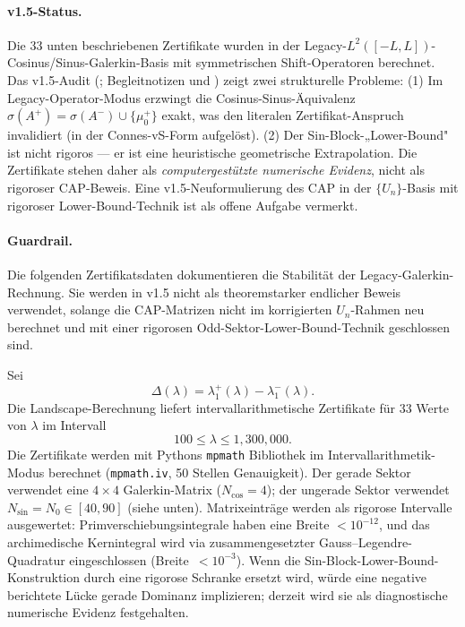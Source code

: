 \documentclass[11pt,a4paper]{article}
\theoremstyle{remark}
\theoremstyle{plain}
\begin{document}
\paragraph{v1.5-Status.} Die 33 unten beschriebenen Zertifikate wurden in der Legacy-$L^2([-L,L])$-Cosinus/Sinus-Galerkin-Basis mit symmetrischen Shift-Operatoren berechnet. Das v1.5-Audit (; Begleitnotizen  und ) zeigt zwei strukturelle Probleme: (1) Im Legacy-Operator-Modus erzwingt die Cosinus-Sinus-Äquivalenz $\sigma(A^+) = \sigma(A^-) \cup \{\mu^+_0\}$ exakt, was den literalen Zertifikat-Anspruch invalidiert (in der Connes-vS-Form aufgelöst). (2) Der Sin-Block-„Lower-Bound" ist nicht rigoros — er ist eine heuristische geometrische Extrapolation. Die Zertifikate stehen daher als \emph{computergestützte numerische Evidenz}, nicht als rigoroser CAP-Beweis. Eine v1.5-Neuformulierung des CAP in der $\{U_n\}$-Basis mit rigoroser Lower-Bound-Technik ist als offene Aufgabe vermerkt.

\paragraph{Guardrail.}  Die folgenden Zertifikatsdaten dokumentieren die
Stabilität der Legacy-Galerkin-Rechnung. Sie werden in v1.5 nicht als
theoremstarker endlicher Beweis verwendet, solange die CAP-Matrizen nicht im
korrigierten $U_n$-Rahmen neu berechnet und mit einer rigorosen
Odd-Sektor-Lower-Bound-Technik geschlossen sind.

\bigskip

Sei
\[
  \Delta(\lambda)=\lambda_1^+(\lambda)-\lambda_1^-(\lambda).
\]
Die Landscape-Berechnung liefert intervallarithmetische Zertifikate für $33$ Werte von $\lambda$ im Intervall
\[
  100\leq\lambda\leq 1{,}300{,}000.
\]
Die Zertifikate werden mit Pythons \texttt{mpmath} Bibliothek im Intervallarithmetik-Modus berechnet (\texttt{mpmath.iv}, 50 Stellen Genauigkeit). Der gerade Sektor verwendet eine $4\times 4$ Galerkin-Matrix ($N_{\cos}=4$); der ungerade Sektor verwendet $N_{\sin}=N_0\in[40,90]$ (siehe  unten). Matrixeinträge werden als rigorose Intervalle ausgewertet: Primverschiebungsintegrale haben eine Breite $<10^{-12}$, und das archimedische Kernintegral wird via zusammengesetzter Gauss--Legendre-Quadratur eingeschlossen (Breite~$<10^{-3}$). Wenn die Sin-Block-Lower-Bound-Konstruktion durch eine rigorose Schranke ersetzt wird, würde eine negative berichtete Lücke gerade Dominanz implizieren; derzeit wird sie als diagnostische numerische Evidenz festgehalten.
\end{document}
